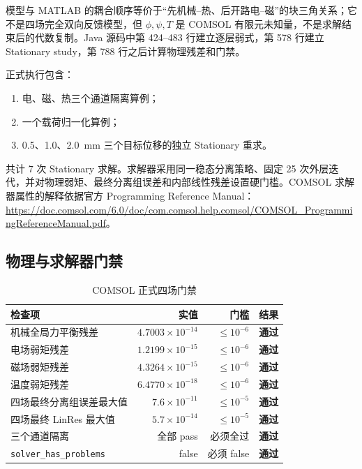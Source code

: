 \documentclass[UTF8,fontset=windows,12pt,a4paper]{ctexart}
\newcommand{\pass}{\textcolor{auditgreen}{\textbf{通过}}}
\begin{document}
模型与 MATLAB 的耦合顺序等价于“先机械--热、后开路电--磁”的块三角关系；它不是四场完全双向反馈模型，但 $\phi,\psi,T$ 是 COMSOL 有限元未知量，不是求解结束后的代数复制。Java 源码中第 424--483 行建立逐层弱式，第 578 行建立 Stationary study，第 788 行之后计算物理残差和门禁。

正式执行包含：

\begin{enumerate}[leftmargin=2.6em]
  \item 电、磁、热三个通道隔离算例；
  \item 一个载荷归一化算例；
  \item 0.5、1.0、2.0~mm 三个目标位移的独立 Stationary 重求。
\end{enumerate}

共计 7 次 Stationary 求解。求解器采用同一稳态分离策略、固定 25 次外层迭代，并对物理弱矩、最终分离组误差和内部线性残差设置硬门槛。COMSOL 求解器属性的解释依据官方 Programming Reference Manual：\url{https://doc.comsol.com/6.0/doc/com.comsol.help.comsol/COMSOL_ProgrammingReferenceManual.pdf}。

\subsection{物理与求解器门禁}

\begin{table}[H]
\centering
\caption{COMSOL 正式四场门禁}
\label{tab:comsol-gates}
\small
\begin{tabularx}{\textwidth}{Yrrp{0.14\textwidth}}
\toprule
检查项 & 实值 & 门槛 & 结果 \\
\midrule
机械全局力平衡残差 & $4.7003\times10^{-14}$ & $\leq10^{-6}$ & \pass \\
电场弱矩残差 & $1.2199\times10^{-15}$ & $\leq10^{-6}$ & \pass \\
磁场弱矩残差 & $4.3264\times10^{-15}$ & $\leq10^{-6}$ & \pass \\
温度弱矩残差 & $6.4770\times10^{-18}$ & $\leq10^{-6}$ & \pass \\
四场最终分离组误差最大值 & $7.6\times10^{-11}$ & $\leq10^{-5}$ & \pass \\
四场最终 LinRes 最大值 & $5.7\times10^{-14}$ & $\leq10^{-5}$ & \pass \\
三个通道隔离 & 全部 pass & 必须全过 & \pass \\
\texttt{solver\_has\_problems} & false & 必须 false & \pass \\
\bottomrule
\end{tabularx}
\end{table}
\end{document}
